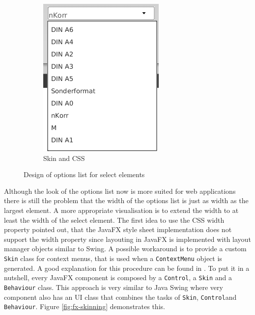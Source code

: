 \begin{figure}
\begin{subfigure}[b]{0.3\textwidth}
                \includegraphics[width=\textwidth]{./img/impl/context_menu_final.png}
                \caption{Skin and CSS}
                \label{fig:context_menu_final}
        \end{subfigure}
        \caption{Design of options list for select elements}\label{fig:context_menu_comp}
\end{figure}

Although the look of the options list now is more suited for web applications there is still the problem that the width of the options list is just as width as the largest element.
A more appropriate visualisation is to extend the width to at least the width of the select element. 
The first idea to use the CSS width property pointed out, that the JavaFX style sheet implementation does not support the width property since layouting in JavaFX is implemented with layout manager objects similar to Swing. 
A possible workaround is to provide a custom \texttt{Skin} class for context menus, that is used when a \texttt{ContextMenu} object is generated. 
A good explanation for this procedure can be found in \autocite{impl:fx-ui-controls}. 
To put it in a nutshell, every JavaFX component is composed by a \texttt{Control}, a \texttt{Skin} and a \texttt{Behaviour} class. 
This approach is very similar to Java Swing where very component also has an UI class that combines the tasks of \texttt{Skin}, \texttt{Control}and \texttt{Behaviour}. 
Figure \ref{fig:fx-skinning} demonstrates this.

